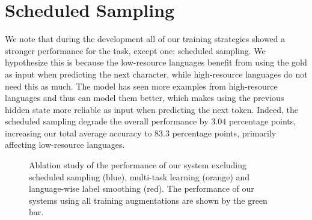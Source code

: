 \documentclass[11pt,a4paper]{article}
\begin{document}
\section{Scheduled Sampling}

We note that during the development all of our training strategies
showed a stronger performance for the task, except one: scheduled
sampling.  We hypothesize this is because the low-resource languages
benefit from using the gold as input when predicting the next
character, while high-resource languages do not need this as much. The
model has seen more examples from high-resource languages and thus can
model them better, which makes using the previous hidden state more
reliable as input when predicting the next token. Indeed, the
scheduled sampling degrade the overall performance by $3.04$
percentage points, increasing our total average accuracy to $83.3$
percentage points, primarily affecting low-resource languages.

\begin{figure}
\caption{\label{fig:data_acc} Ablation study of the performance of our system excluding scheduled sampling (blue), multi-task learning (orange) and language-wise label smoothing (red). The performance of our systems using all training augmentations are shown by the green bar.}
\end{figure}
\end{document}
